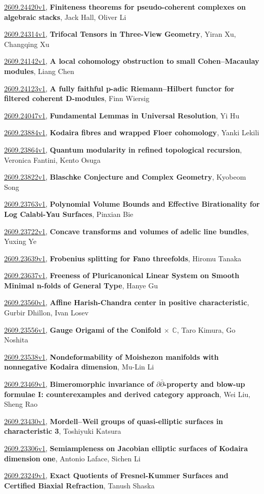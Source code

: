 \documentclass[9pt, a4paper]{article}
\theoremstyle{plain}
\theoremstyle{definition}
\theoremstyle{remark}
\newcommand{\arxiv}[3]{\href{https://arxiv.org/abs/#1}{#1}, \textbf{\textcolor{arxivblue}{#2}}, #3}
\begin{document}
\arxiv{2609.24420v1}{Finiteness theorems for pseudo-coherent complexes on algebraic stacks}{Jack Hall, Oliver Li}

\arxiv{2609.24314v1}{Trifocal Tensors in Three-View Geometry}{Yiran Xu, Changqing Xu}

\arxiv{2609.24142v1}{A local cohomology obstruction to small Cohen--Macaulay modules}{Liang Chen}

\arxiv{2609.24123v1}{A fully faithful p-adic Riemann--Hilbert functor for filtered coherent D-modules}{Finn Wiersig}

\arxiv{2609.24047v1}{Fundamental Lemmas in Universal Resolution}{Yi Hu}

\arxiv{2609.23884v1}{Kodaira fibres and wrapped Floer cohomology}{Yanki Lekili}

\arxiv{2609.23864v1}{Quantum modularity in refined topological recursion}{Veronica Fantini, Kento Osuga}

\arxiv{2609.23822v1}{Blaschke Conjecture and Complex Geometry}{Kyobeom Song}

\arxiv{2609.23763v1}{Polynomial Volume Bounds and Effective Birationality for Log Calabi-Yau Surfaces}{Pinxian Bie}

\arxiv{2609.23722v1}{Concave transforms and volumes of adelic line bundles}{Yuxing Ye}

\arxiv{2609.23639v1}{Frobenius splitting for Fano threefolds}{Hiromu Tanaka}

\arxiv{2609.23637v1}{Freeness of Pluricanonical Linear System on Smooth Minimal n-folds of General Type}{Hanye Gu}

\arxiv{2609.23560v1}{Affine Harish-Chandra center in positive characteristic}{Gurbir Dhillon, Ivan Losev}

\arxiv{2609.23556v1}{Gauge Origami of the Conifold $\times$ $\mathbb{C}$}{Taro Kimura, Go Noshita}

\arxiv{2609.23538v1}{Nondeformability of Moishezon manifolds with nonnegative Kodaira dimension}{Mu-Lin Li}

\arxiv{2609.23469v1}{Bimeromorphic invariance of $\partial\bar\partial$-property and blow-up formulae I: counterexamples and derived category approach}{Wei Liu, Sheng Rao}

\arxiv{2609.23430v1}{Mordell--Weil groups of quasi-elliptic surfaces in characteristic 3}{Toshiyuki Katsura}

\arxiv{2609.23306v1}{Semiampleness on Jacobian elliptic surfaces of Kodaira dimension one}{Antonio Laface, Sichen Li}

\arxiv{2609.23249v1}{Exact Quotients of Fresnel-Kummer Surfaces and Certified Biaxial Refraction}{Tanush Shaska}
\end{document}
